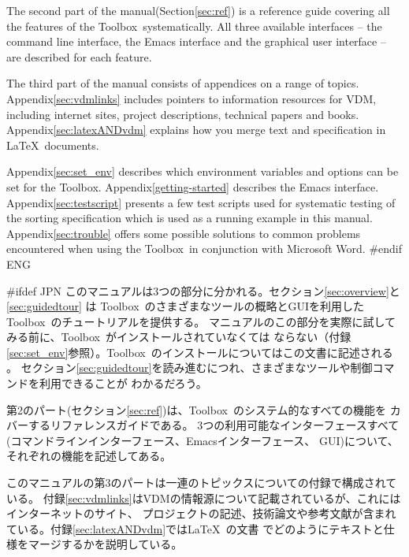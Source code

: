 \documentclass[\pformat,12pt]{article}
\newcommand{\Toolbox}{Toolbox}
\newcommand{\Toolbox}{Toolbox}
\begin{document}
The second part of the manual(Section\ref{sec:ref}) is a reference
guide covering all the features of the \Toolbox\ systematically. All three
available interfaces -- the command line interface, the Emacs interface
and the graphical user interface -- are described for each feature.

The third part of the manual consists of appendices on a range of
topics. 
 Appendix\ref{sec:vdmlinks} includes
pointers to information resources for VDM, including internet sites,
project descriptions, technical papers and books.
Appendix\ref{sec:latexANDvdm} explains how you merge text and
specification in \LaTeX\ documents.

Appendix\ref{sec:set_env} describes which environment
variables and options can be set for the \Toolbox.
Appendix\ref{getting-started} describes the Emacs interface.
Appendix\ref{sec:testscript} presents a few test scripts used for
systematic testing of the sorting specification which is used as a
running example in this manual.  
Appendix\ref{sec:trouble} offers some possible solutions 
to common problems encountered when using the \Toolbox\ in conjunction
with Microsoft Word.  
#endif ENG

#ifdef JPN
このマニュアルは3つの部分に分かれる。セクション\ref{sec:overview}と\ref{sec:guidedtour} は
\Toolbox\ のさまざまなツールの概略とGUIを利用した\Toolbox\ のチュートリアルを提供する。
マニュアルのこの部分を実際に試してみる前に、\Toolbox\ がインストールされていなくては
ならない（付録\ref{sec:set_env}参照）。\Toolbox\ のインストールについてはこの文書に記述される
。
セクション\ref{sec:guidedtour}を読み進むにつれ、さまざまなツールや制御コマンドを利用できることが
わかるだろう。

第2のパート(セクション\ref{sec:ref})は、\Toolbox\ のシステム的なすべての機能を
カバーするリファレンスガイドである。
3つの利用可能なインターフェースすべて(コマンドラインインターフェース、Emacsインターフェース、
GUI)について、それぞれの機能を記述してある。

このマニュアルの第3のパートは一連のトピックスについての付録で構成されている。
付録\ref{sec:vdmlinks}はVDMの情報源について記載されているが、これにはインターネットのサイト、
プロジェクトの記述、技術論文や参考文献が含まれている。付録\ref{sec:latexANDvdm}では\LaTeX\ の文書
でどのようにテキストと仕様をマージするかを説明している。
\end{document}

